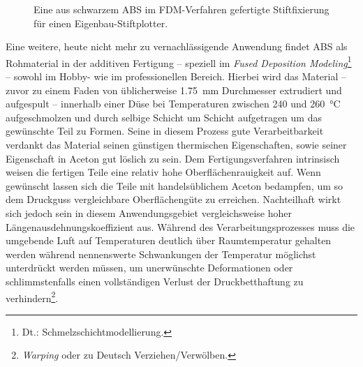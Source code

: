             \begin{figure}
                \centering
                \vspace{-\baselineskip}
                \caption[Eine aus schwarzem ABS im FDM-Verfahren gefertigte Stiftfixierung]{Eine aus schwarzem ABS im FDM-Verfahren gefertigte Stiftfixierung für einen Eigenbau-Stiftplotter.}%
                \label{fig:3dDruck ABS teil}
            \end{figure}
            Eine weitere, heute nicht mehr zu vernachlässigende Anwendung findet ABS als Rohmaterial in der additiven Fertigung
             – speziell im \textit{Fused Deposition Modeling}\footnote{Dt.: Schmelzschichtmodellierung.} – sowohl im Hobby-
            wie im professionellen Bereich. Hierbei wird das Material – zuvor zu einem Faden von üblicherweise \SI{1,75}{mm}
            Durchmesser extrudiert und aufgespult – innerhalb einer Düse bei Temperaturen zwischen \SI{240}{} und \SI{260}{\celsius} aufgeschmolzen
            und durch selbige Schicht um Schicht aufgetragen um das gewünschte Teil zu Formen. Seine in diesem Prozess gute
            Verarbeitbarkeit verdankt das Material seinen günstigen thermischen Eigenschaften, sowie seiner Eigenschaft in
            Aceton gut löslich zu sein. Dem Fertigungsverfahren intrinsisch weisen die fertigen Teile eine relativ hohe
            Oberflächenrauigkeit auf. Wenn gewünscht lassen sich die Teile mit handelsüblichem Aceton bedampfen, um so
            dem Druckguss vergleichbare Oberflächengüte zu erreichen. Nachteilhaft wirkt sich jedoch sein in diesem Anwendungsgebiet
            vergleichsweise hoher Längenausdehnungskoeffizient aus. Während des Verarbeitungsprozesses muss die umgebende Luft
            auf Temperaturen deutlich über Raumtemperatur gehalten werden während nennenswerte Schwankungen der Temperatur
            möglichst unterdrückt werden müssen, um unerwünschte Deformationen oder schlimmstenfalls einen vollständigen
            Verlust der Druckbetthaftung zu verhindern\footnote{\textit{Warping} oder zu Deutsch Verziehen/Verwölben.}.
